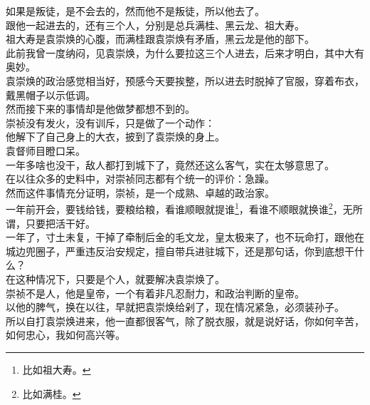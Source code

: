 \begin{multicols}{\theparacolNo}
如果是叛徒，是不会去的，然而他不是叛徒，所以他去了。\\

跟他一起进去的，还有三个人，分别是总兵满桂、黑云龙、祖大寿。\\

祖大寿是袁崇焕的心腹，而满桂跟袁崇焕有矛盾，黑云龙是他的部下。\\

此前我曾一度纳闷，见袁崇焕，为什么要拉这三个人进去，后来才明白，其中大有奥妙。\\

袁崇焕的政治感觉相当好，预感今天要挨整，所以进去时脱掉了官服，穿着布衣，戴黑帽子以示低调。\\

然而接下来的事情却是他做梦都想不到的。\\

崇祯没有发火，没有训斥，只是做了一个动作：\\

他解下了自己身上的大衣，披到了袁崇焕的身上。\\

袁督师目瞪口呆。\\

一年多啥也没干，敌人都打到城下了，竟然还这么客气，实在太够意思了。\\

在以往众多的史料中，对崇祯同志都有个统一的评价：急躁。\\

然而这件事情充分证明，崇祯，是一个成熟、卓越的政治家。\\

一年前开会，要钱给钱，要粮给粮，看谁顺眼就提谁\footnote{比如祖大寿。}，看谁不顺眼就换谁\footnote{比如满桂。}，无所谓，只要把活干好。\\

一年了，寸土未复，干掉了牵制后金的毛文龙，皇太极来了，也不玩命打，跟他在城边兜圈子，严重违反治安规定，擅自带兵进驻城下，还是那句话，你到底想干什么？\\

在这种情况下，只要是个人，就要解决袁崇焕了。\\

崇祯不是人，他是皇帝，一个有着非凡忍耐力，和政治判断的皇帝。\\

以他的脾气，换在以往，早就把袁崇焕给剁了，现在情况紧急，必须装孙子。\\

所以自打袁崇焕进来，他一直都很客气，除了脱衣服，就是说好话，你如何辛苦，如何忠心，我如何高兴等。\\


\end{multicols}
